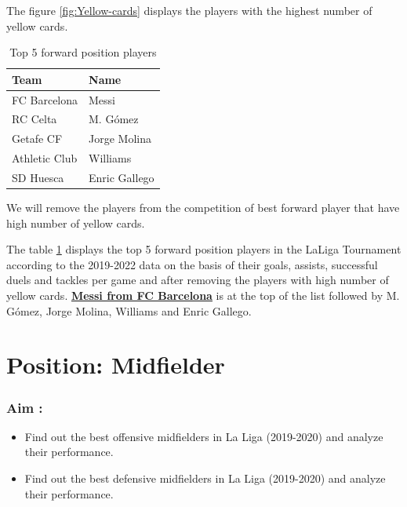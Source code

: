 \documentclass[11pt,a4paper,]{article}
\begin{document}
The figure \ref{fig:Yellow-cards} displays the players with the highest number of yellow cards.

\begin{table}[H]

\caption{\label{tab:Top}Top 5 forward position players}
\centering
\begin{tabular}[t]{l|l}
\hline
Team & Name\\
\hline
FC Barcelona & Messi\\
\hline
RC Celta & M. Gómez\\
\hline
Getafe CF & Jorge Molina\\
\hline
Athletic Club & Williams\\
\hline
SD Huesca & Enric Gallego\\
\hline
\end{tabular}
\end{table}

We will remove the players from the competition of best forward player that have high number of yellow cards.

The table \ref{tab:Top} displays the top 5 forward position players in the LaLiga Tournament according to the 2019-2022 data on the basis of their goals, assists, successful duels and tackles per game and after removing the players with high number of yellow cards. \textbf{\href{images/messi.jpeg}{Messi from FC Barcelona}} is at the top of the list followed by M. Gómez, Jorge Molina, Williams and Enric Gallego.\\

\newpage

\hypertarget{position-midfielder}{%
\section{Position: Midfielder}\label{position-midfielder}}

\hypertarget{aim}{%
\subsubsection{Aim :}\label{aim}}

\begin{itemize}
\item
  Find out the best offensive midfielders in La Liga (2019-2020) and analyze their performance.
\item
  Find out the best defensive midfielders in La Liga (2019-2020) and analyze their performance.
\end{itemize}
\end{document}

